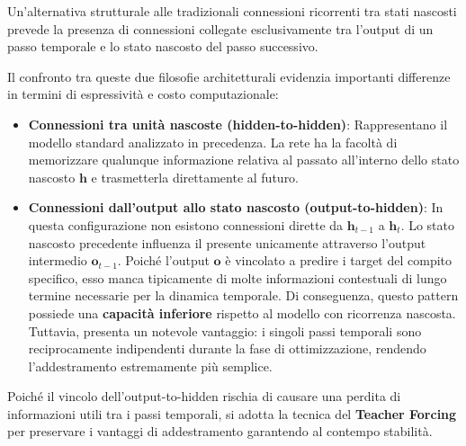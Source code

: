 ﻿\documentclass[11pt, a4paper]{article}
\begin{document}
Un'alternativa strutturale alle tradizionali connessioni ricorrenti tra stati nascosti prevede la presenza di connessioni collegate esclusivamente tra l'output di un passo temporale e lo stato nascosto del passo successivo.


Il confronto tra queste due filosofie architetturali evidenzia importanti differenze in termini di espressività e costo computazionale:
\begin{itemize}
    \item \textbf{Connessioni tra unità nascoste (hidden-to-hidden)}: Rappresentano il modello standard analizzato in precedenza. La rete ha la facoltà di memorizzare qualunque informazione relativa al passato all'interno dello stato nascosto $\bm{h}$ e trasmetterla direttamente al futuro.
    \item \textbf{Connessioni dall'output allo stato nascosto (output-to-hidden)}: In questa configurazione non esistono connessioni dirette da $\bm{h}_{t-1}$ a $\bm{h}_t$. Lo stato nascosto precedente influenza il presente unicamente attraverso l'output intermedio $\bm{o}_{t-1}$. Poiché l'output $\bm{o}$ è vincolato a predire i target del compito specifico, esso manca tipicamente di molte informazioni contestuali di lungo termine necessarie per la dinamica temporale. Di conseguenza, questo pattern possiede una \textbf{capacità inferiore} rispetto al modello con ricorrenza nascosta. Tuttavia, presenta un notevole vantaggio: i singoli passi temporali sono reciprocamente indipendenti durante la fase di ottimizzazione, rendendo l'addestramento estremamente più semplice.
\end{itemize}

Poiché il vincolo dell'output-to-hidden rischia di causare una perdita di informazioni utili tra i passi temporali, si adotta la tecnica del \textbf{Teacher Forcing} per preservare i vantaggi di addestramento garantendo al contempo stabilità.

\end{document}
